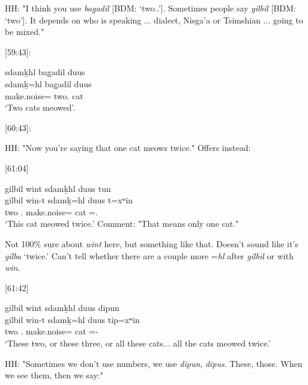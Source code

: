 \documentclass{article}
\begin{document}
HH: "I think you use \textit{bag̱adil} [BDM: `two.\Hum{}.']. Sometimes people say \textit{gilbil} [BDM: `two']. It depends on who is speaking ... dialect, Nisga'a or Tsimshian ... going to be mixed." 

[59:43]:
\begin{exe}
    \ex \glll
    sdamḵhl bag̱adil duus \\
    sdamḵ=hl bag̱adil duus \\
    make.noise=\Cn{} two.\Hum{} cat \\
    \glt `Two cats meowed'.
\end{exe}

[60:43]: 
\begin{exe}
\end{exe}

HH: "Now you're saying that one cat meows twice." Offers instead:

[61:04]
 \begin{exe}
    \ex \glll
    gilbil wint sdamḵhl duus tun \\
    gilbil win-t sdamḵ=hl  duus t=xʷin \\
     two .\I{}  make.noise=\Cn{} cat \Pn=\Dem.\Prox \\
    \glt `This cat meowed twice.' Comment: "That means only one cat."
\end{exe}

Not 100\% sure about \textit{wint} here, but something like that. Doesn't sound like it's \textit{gilba} `twice.' Can't tell whether there are a couple more =\textit{hl} after \textit{gilbil} or with \textit{win}.

[61:42]
 \begin{exe}
    \ex \glll
    gilbil wint sdamḵhl duus dipun \\
    gilbil win-t sdamḵ=hl  duus tip=xʷin \\
    two .\I{}  make.noise=\Cn{} cat \Pn=\Dem-\Prox \\
    \glt `These two, or these three, or all these cats... all the cats meowed twice.' 
\end{exe}

HH: "Sometimes we don't use numbers, we use \textit{dipun}, \textit{dipus}. These, those. When we see them, then we say:"
\end{document}
